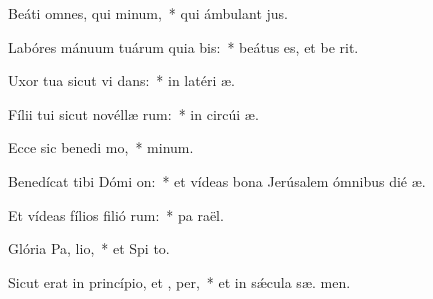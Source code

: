 \item Beáti omnes, qui  minum,~* qui ámbulant   jus.
\item Labóres mánuum tuárum quia bis:~* beátus es, et be  rit.
\item Uxor tua sicut vi dans:~* in latéri  æ.
\item Fílii tui sicut novéllæ rum:~* in circúi  æ.
\item Ecce sic benedi mo,~*   minum.
\item Benedícat tibi Dómi  on:~* et vídeas bona Jerúsalem ómnibus dié  æ.
\item Et vídeas fílios filió rum:~* pa  raël.
\item Glória Pa,  lio,~* et Spi to.
\item Sicut erat in princípio, et ,  per,~* et in sǽcula sæ. men.
